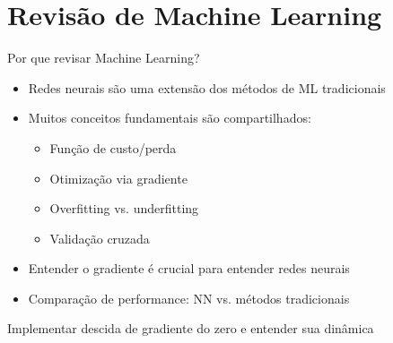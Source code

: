 \documentclass[xcolor=dvipsnames,t,aspectratio=169]{beamer} %
\newcommand{\highlight}[1]{{\color{nes_dark_orange} #1}}
\begin{document}
\section{Revisão de Machine Learning}
\begin{frame}[c]{Por que revisar Machine Learning?}
    \begin{itemize}
        \item Redes neurais são uma \highlight{extensão} dos métodos de ML tradicionais
        \item Muitos conceitos fundamentais são compartilhados:
        \begin{itemize}
            \item \highlight{Função de custo/perda}
            \item \highlight{Otimização via gradiente}
            \item Overfitting vs. underfitting
            \item Validação cruzada
        \end{itemize}
        \item Entender o \highlight{gradiente} é crucial para entender redes neurais
        \item Comparação de performance: NN vs. métodos tradicionais
    \end{itemize}
    
    \vspace{0.5cm}
    \begin{display}
        Implementar \highlight{descida de gradiente} do zero e entender sua dinâmica
    \end{display}
\end{frame}
\end{document}
